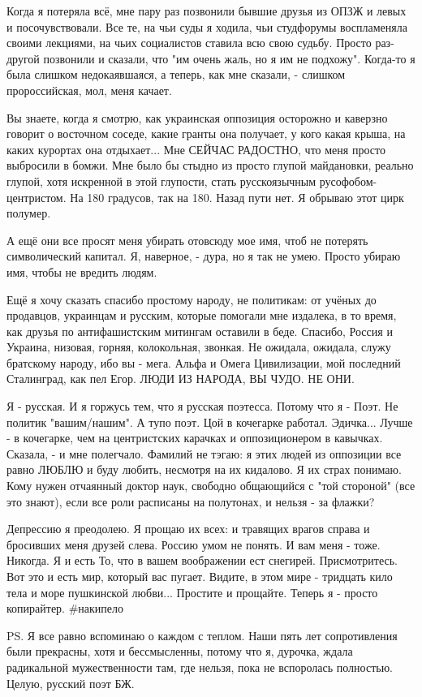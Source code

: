 Когда я потеряла всё, мне пару раз позвонили бывшие друзья из ОПЗЖ и левых и
посочувствовали. Все те, на чьи суды я ходила, чьи студфорумы воспламеняла
своими лекциями, на чьих социалистов ставила всю свою судьбу. Просто раз-другой
позвонили и сказали, что "им очень жаль, но я им не подхожу". Когда-то я была
слишком недокаявшаяся, а теперь, как мне сказали, - слишком пророссийская, мол,
меня качает.

Вы знаете, когда я смотрю, как украинская оппозиция осторожно и каверзно
говорит о восточном соседе, какие гранты она получает, у кого какая крыша, на
каких курортах она отдыхает... Мне СЕЙЧАС РАДОСТНО, что меня просто выбросили в
бомжи. Мне было бы стыдно из просто глупой майдановки, реально глупой, хотя
искренной в этой глупости, стать русскоязычным русофобом-центристом. На 180
градусов, так на 180. Назад пути нет. Я обрываю этот цирк полумер.

А ещё они все просят меня убирать отовсюду мое имя, чтоб не потерять
символический капитал. Я, наверное, - дура, но я так не умею. Просто убираю
имя, чтобы не вредить людям.

Ещё я хочу сказать спасибо простому народу, не политикам: от учёных до
продавцов, украинцам и русским, которые помогали мне издалека, в то время, как
друзья по антифашистским митингам оставили в беде. Спасибо, Россия и Украина,
низовая, горняя, колокольная, звонкая. Не ожидала, ожидала, служу братскому
народу, ибо вы - мега. Альфа и Омега Цивилизации, мой последний Сталинград, как
пел Егор. ЛЮДИ ИЗ НАРОДА, ВЫ ЧУДО. НЕ ОНИ.

Я - русская. И я горжусь тем, что я русская поэтесса. Потому что я - Поэт. Не
политик "вашим/нашим". А тупо поэт. Цой в кочегарке работал. Эдичка... Лучше -
в кочегарке, чем на центристских карачках и оппозиционером в кавычках. Сказала,
- и мне полегчало. Фамилий не тэгаю: я этих людей из оппозиции все равно ЛЮБЛЮ
и буду любить, несмотря на их кидалово. Я их страх понимаю. Кому нужен
отчаянный доктор наук, свободно общающийся с "той стороной" (все это знают),
если все роли расписаны на полутонах, и нельзя - за флажки?

Депрессию я преодолею. Я прощаю их всех: и травящих врагов справа и бросивших
меня друзей слева. Россию умом не понять. И вам меня - тоже. Никогда. Я и есть
То, что в вашем воображении ест снегирей. Присмотритесь. Вот это и есть мир,
который вас пугает. Видите, в этом мире - тридцать кило тела и море пушкинской
любви... Простите и прощайте. Теперь я - просто копирайтер.  \#накипело

PS. Я все равно вспоминаю о каждом с теплом. Наши пять лет сопротивления были
прекрасны, хотя и бессмысленны, потому что я, дурочка, ждала радикальной
мужественности там, где нельзя, пока не вспоролась полностью. Целую, русский
поэт БЖ.

